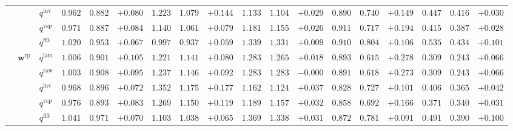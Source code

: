 \documentclass[eng]{kjas3}
\begin{document}
\begin{table}[t]
{\begin{tabular}{lll ccc ccc ccc ccc ccc}
 &  & $q^{\mathrm{inv}}$ & $0.962$ & $0.882$ & \cellcolor{posgreen!50}$+0.080$ & $1.223$ & $1.079$ & \cellcolor{posgreen!50}$+0.144$ & $1.133$ & $1.104$ & \cellcolor{posgreen!50}$+0.029$ & $0.890$ & $0.740$ & \cellcolor{posgreen!50}$+0.149$ & $0.447$ & $0.416$ & \cellcolor{posgreen!50}$+0.030$ \\
 &  & $q^{\mathrm{vsp}}$ & $0.971$ & $0.887$ & \cellcolor{posgreen!50}$+0.084$ & $1.140$ & $1.061$ & \cellcolor{posgreen!50}$+0.079$ & $1.181$ & $1.155$ & \cellcolor{posgreen!50}$+0.026$ & $0.911$ & $0.717$ & \cellcolor{posgreen!50}$+0.194$ & $0.415$ & $0.387$ & \cellcolor{posgreen!50}$+0.028$ \\
 &  & $q^{\mathrm{ff3}}$ & $1.020$ & $0.953$ & \cellcolor{posgreen!50}$+0.067$ & $0.997$ & $0.937$ & \cellcolor{posgreen!50}$+0.059$ & $1.339$ & $1.331$ & \cellcolor{posgreen!50}$+0.009$ & $0.910$ & $0.804$ & \cellcolor{posgreen!50}$+0.106$ & $0.535$ & $0.434$ & \cellcolor{posgreen!50}$+0.101$ \\
\cmidrule(lr){2-18}
 & $\mathbf{w}^{\mathrm{rp}}$ & $q^{\mathrm{lam}}$ & $1.006$ & $0.901$ & \cellcolor{posgreen!50}$+0.105$ & $1.221$ & $1.141$ & \cellcolor{posgreen!50}$+0.080$ & $1.283$ & $1.265$ & \cellcolor{posgreen!50}$+0.018$ & $0.893$ & $0.615$ & \cellcolor{posgreen!50}$+0.278$ & $0.309$ & $0.243$ & \cellcolor{posgreen!50}$+0.066$ \\
 &  & $q^{\mathrm{raw}}$ & $1.003$ & $0.908$ & \cellcolor{posgreen!50}$+0.095$ & $1.237$ & $1.146$ & \cellcolor{posgreen!50}$+0.092$ & $1.283$ & $1.283$ & $-0.000$ & $0.891$ & $0.618$ & \cellcolor{posgreen!50}$+0.273$ & $0.309$ & $0.243$ & \cellcolor{posgreen!50}$+0.066$ \\
 &  & $q^{\mathrm{inv}}$ & $0.968$ & $0.896$ & \cellcolor{posgreen!50}$+0.072$ & $1.352$ & $1.175$ & \cellcolor{posgreen!50}$+0.177$ & $1.162$ & $1.124$ & \cellcolor{posgreen!50}$+0.037$ & $0.828$ & $0.727$ & \cellcolor{posgreen!50}$+0.101$ & $0.406$ & $0.365$ & \cellcolor{posgreen!50}$+0.042$ \\
 &  & $q^{\mathrm{vsp}}$ & $0.976$ & $0.893$ & \cellcolor{posgreen!50}$+0.083$ & $1.269$ & $1.150$ & \cellcolor{posgreen!50}$+0.119$ & $1.189$ & $1.157$ & \cellcolor{posgreen!50}$+0.032$ & $0.858$ & $0.692$ & \cellcolor{posgreen!50}$+0.166$ & $0.371$ & $0.340$ & \cellcolor{posgreen!50}$+0.031$ \\
 &  & $q^{\mathrm{ff3}}$ & $1.041$ & $0.971$ & \cellcolor{posgreen!50}$+0.070$ & $1.103$ & $1.038$ & \cellcolor{posgreen!50}$+0.065$ & $1.369$ & $1.338$ & \cellcolor{posgreen!50}$+0.031$ & $0.872$ & $0.781$ & \cellcolor{posgreen!50}$+0.091$ & $0.491$ & $0.390$ & \cellcolor{posgreen!50}$+0.100$ \\
\bottomrule
\end{tabular}}
\end{table}
\end{document}
